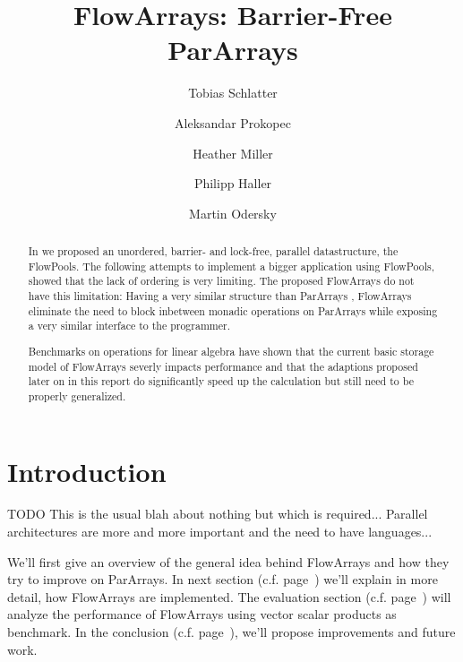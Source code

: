 \documentclass[runningheads,a4paper,fleqn]{llncs}
\begin{document}
\title{FlowArrays: Barrier-Free ParArrays}
\author{Tobias Schlatter \and Aleksandar Prokopec \and
  Heather Miller \and Philipp Haller \and Martin
  Odersky}



\graphicspath{{figs/}}

\newcommand{\plot}[1]{}

\maketitle

\begin{abstract}
  In \cite{FP12} we proposed an unordered, barrier- and lock-free,
  parallel datastructure, the FlowPools. The following attempts to
  implement a bigger application using FlowPools, showed that the lack
  of ordering is very limiting. The proposed FlowArrays do not have
  this limitation: Having a very similar structure than ParArrays
  \cite{collect11}, FlowArrays eliminate the need to block inbetween
  monadic operations on ParArrays while exposing a very similar
  interface to the programmer.

  Benchmarks on operations for linear algebra have shown that the
  current basic storage model of FlowArrays severly impacts
  performance and that the adaptions proposed later on in this report
  do significantly speed up the calculation but still need to be
  properly generalized.
\end{abstract}

\section{Introduction}
TODO This is the usual blah about nothing but which is
required... Parallel architectures are more and more important and the
need to have languages... 

We'll first give an overview of the general idea behind FlowArrays and
how they try to improve on ParArrays. In next section
(c.f. page~\pageref{sec:implementation}) we'll explain in more detail,
how FlowArrays are implemented. The evaluation section
(c.f. page~\pageref{sec:evaluation}) will analyze the performance of
FlowArrays using vector scalar products as benchmark. In the
conclusion (c.f. page~\pageref{sec:conclusion}), we'll propose
improvements and future work.
\end{document}
